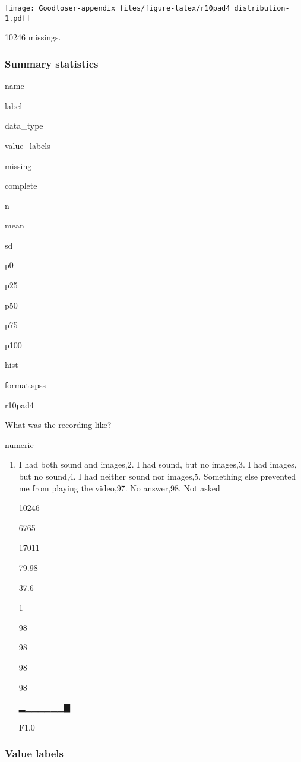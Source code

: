 \documentclass[]{book}
\providecommand{\tightlist}{%
  \setlength{\itemsep}{0pt}\setlength{\parskip}{0pt}}
\begin{document}
\texttt{[image: Goodloser-appendix\_files/figure-latex/r10pad4\_distribution-1.pdf]}

10246 missings.

\subsubsection{Summary statistics}\label{r10pad4_summary}

name

label

data\_type

value\_labels

missing

complete

n

mean

sd

p0

p25

p50

p75

p100

hist

format.spss

r10pad4

What was the recording like?

numeric

\begin{enumerate}
\def\labelenumi{\arabic{enumi}.}
\tightlist
\item
  I had both sound and images,2. I had sound, but no images,3. I had
  images, but no sound,4. I had neither sound nor images,5. Something
  else prevented me from playing the video,97. No answer,98. Not asked

  10246

  6765

  17011

  79.98

  37.6

  1

  98

  98

  98

  98

  ▂▁▁▁▁▁▁▇

  F1.0
\end{enumerate}

\subsubsection{Value labels}\label{r10pad4_labels}
\end{document}
